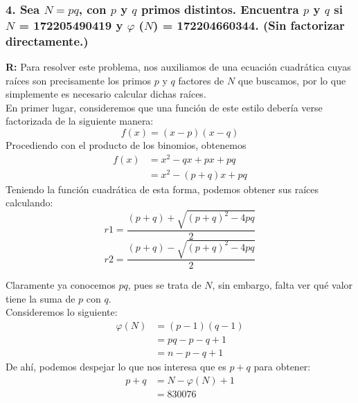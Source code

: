\documentclass[14pt]{article}
\begin{document}
\subsubsection*{4. Sea $N = pq$, con $p$ y $q$ primos distintos. Encuentra $p$ y $q$ si $N$ = 172205490419 y $\varphi$ ($N$) = 172204660344. (Sin factorizar directamente.)}
\textbf{R:} Para resolver este problema, nos auxiliamos de una ecuación cuadrática cuyas raíces son precisamente los primos $p$ y $q$ factores de $N$ que buscamos, por lo que simplemente es necesario
calcular dichas raíces.\\
En primer lugar, consideremos que una función de este estilo debería verse factorizada de la siguiente manera:
\begin{equation}
  f(x) = (x-p)(x-q)
\end{equation}
Procediendo con el producto de los binomios, obtenemos
\begin{equation}
  \begin{split}
    f(x) &= x^2 -qx + px + pq \\
    &= x^2 - (p+q)x + pq
  \end{split}
\end{equation}
Teniendo la función cuadrática de esta forma, podemos obtener sus raíces calculando:
\begin{equation}
  r1 = \frac{(p+q)+ \sqrt{(p+q)^2-4pq}}{2}
\end{equation}
\begin{equation}
  r2 = \frac{(p+q)- \sqrt{(p+q)^2-4pq}}{2}
\end{equation}

Claramente ya conocemos $pq$, pues se trata de $N$, sin embargo, falta ver qué valor tiene la suma de
$p$ con $q$.\\
Consideremos lo siguiente:
\begin{equation}
  \begin{split}
    \varphi(N) &= (p-1)(q-1) \\
    &= pq - p - q + 1\\
    &= n - p - q + 1
  \end{split}
\end{equation}
De ahí, podemos despejar lo que nos interesa que es $p+q$ para obtener:
\begin{equation}
  \begin{split}
    p+q &= N - \varphi(N) + 1  \\
    &= 830076
  \end{split}
\end{equation}
\end{document}

